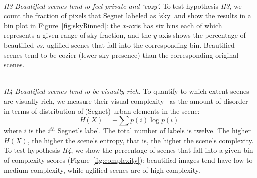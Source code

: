 \mbox{ } \\
\noindent
\emph{H3 Beautified scenes tend to feel private and `cozy'.}
To  test hypothesis \emph{H3}, we count the fraction of pixels that Segnet labeled  as `sky' and show the results in a bin plot in Figure~\ref{fig:skyBinned}:  the $x$-axis has six bins each of which represents a given range of sky fraction, and the $y$-axis shows the percentage of beautified \emph{vs.} uglified scenes that fall into the corresponding bin.  Beautified scenes tend to be cozier (lower sky presence) than the corresponding original scenes.


\mbox{ } \\
\noindent
\emph{H4 Beautified scenes tend to be visually rich.}
To quantify to which extent scenes are visually rich, we measure their visual complexity~\cite{ewing2013measuring} as  the amount of disorder in terms of distribution of (Segnet) urban elements in the scene: 
\begin{equation}
H(X) = -\sum p(i)\log p(i)
\label{eq:entropy} 
\end{equation}
where $i$ is the $i^{th}$ Segnet's label. The total number of labels is twelve. The higher $H(X)$, the  higher the scene's entropy, that is, the higher the scene's complexity. To test hypothesis \emph{H4}, we show the percentage of scenes that fall into a given bin of complexity scores (Figure~\ref{fig:complexity}): beautified images tend have low to medium complexity, while uglified scenes are of high complexity.







